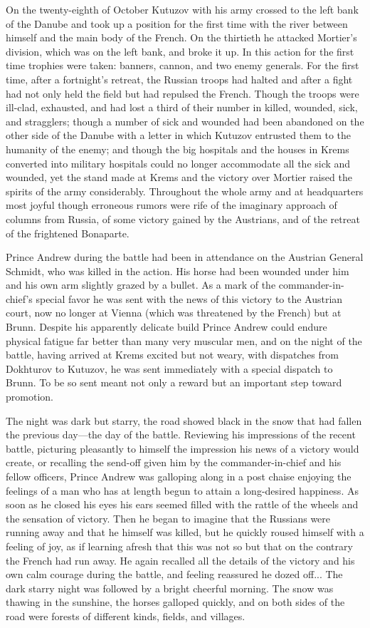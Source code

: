 On the twenty-eighth of October Kutuzov with his army crossed to
the left bank of the Danube and took up a position for the first
time with the river between himself and the main body of the
French. On the thirtieth he attacked Mortier's division, which
was on the left bank, and broke it up. In this action for the
first time trophies were taken: banners, cannon, and two enemy
generals. For the first time, after a fortnight's retreat, the
Russian troops had halted and after a fight had not only held the
field but had repulsed the French. Though the troops were
ill-clad, exhausted, and had lost a third of their number in
killed, wounded, sick, and stragglers; though a number of sick
and wounded had been abandoned on the other side of the Danube
with a letter in which Kutuzov entrusted them to the humanity of
the enemy; and though the big hospitals and the houses in Krems
converted into military hospitals could no longer accommodate all
the sick and wounded, yet the stand made at Krems and the victory
over Mortier raised the spirits of the army
considerably. Throughout the whole army and at headquarters most
joyful though erroneous rumors were rife of the imaginary
approach of columns from Russia, of some victory gained by the
Austrians, and of the retreat of the frightened Bonaparte.

Prince Andrew during the battle had been in attendance on the
Austrian General Schmidt, who was killed in the action. His horse
had been wounded under him and his own arm slightly grazed by a
bullet. As a mark of the commander-in-chief's special favor he
was sent with the news of this victory to the Austrian court, now
no longer at Vienna (which was threatened by the French) but at
Brunn. Despite his apparently delicate build Prince Andrew could
endure physical fatigue far better than many very muscular men,
and on the night of the battle, having arrived at Krems excited
but not weary, with dispatches from Dokhturov to Kutuzov, he was
sent immediately with a special dispatch to Brunn. To be so sent
meant not only a reward but an important step toward promotion.

The night was dark but starry, the road showed black in the snow
that had fallen the previous day---the day of the
battle. Reviewing his impressions of the recent battle, picturing
pleasantly to himself the impression his news of a victory would
create, or recalling the send-off given him by the
commander-in-chief and his fellow officers, Prince Andrew was
galloping along in a post chaise enjoying the feelings of a man
who has at length begun to attain a long-desired happiness. As
soon as he closed his eyes his ears seemed filled with the rattle
of the wheels and the sensation of victory. Then he began to
imagine that the Russians were running away and that he himself
was killed, but he quickly roused himself with a feeling of joy,
as if learning afresh that this was not so but that on the
contrary the French had run away. He again recalled all the
details of the victory and his own calm courage during the
battle, and feeling reassured he dozed off... The dark starry
night was followed by a bright cheerful morning. The snow was
thawing in the sunshine, the horses galloped quickly, and on both
sides of the road were forests of different kinds, fields, and
villages.

